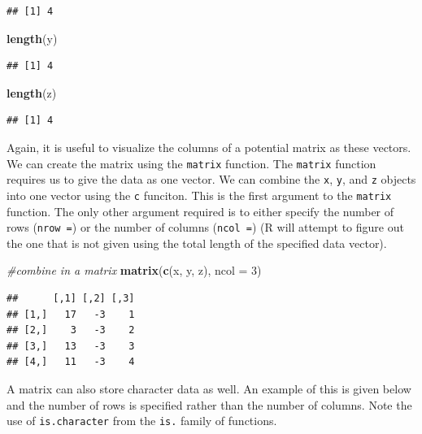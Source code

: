 \documentclass[
]{book}
\newenvironment{Shaded}{\begin{snugshade}}{\end{snugshade}}
\newcommand{\CommentTok}[1]{\textcolor[rgb]{0.56,0.35,0.01}{\textit{#1}}}
\newcommand{\DataTypeTok}[1]{\textcolor[rgb]{0.13,0.29,0.53}{#1}}
\newcommand{\DecValTok}[1]{\textcolor[rgb]{0.00,0.00,0.81}{#1}}
\newcommand{\KeywordTok}[1]{\textcolor[rgb]{0.13,0.29,0.53}{\textbf{#1}}}
\newcommand{\NormalTok}[1]{#1}
\theoremstyle{definition}
\theoremstyle{definition}
\theoremstyle{definition}
\theoremstyle{remark}
\begin{document}
\begin{verbatim}
## [1] 4
\end{verbatim}

\begin{Shaded}
\begin{Highlighting}[]
\KeywordTok{length}\NormalTok{(y)}
\end{Highlighting}
\end{Shaded}

\begin{verbatim}
## [1] 4
\end{verbatim}

\begin{Shaded}
\begin{Highlighting}[]
\KeywordTok{length}\NormalTok{(z)}
\end{Highlighting}
\end{Shaded}

\begin{verbatim}
## [1] 4
\end{verbatim}

Again, it is useful to visualize the columns of a potential matrix as these vectors. We can create the matrix using the \texttt{matrix} function. The \texttt{matrix} function requires us to give the data as one vector. We can combine the \texttt{x}, \texttt{y}, and \texttt{z} objects into one vector using the \texttt{c} funciton. This is the first argument to the \texttt{matrix} function. The only other argument required is to either specify the number of rows (\texttt{nrow\ =}) or the number of columns (\texttt{ncol\ =}) (R will attempt to figure out the one that is not given using the total length of the specified data vector).

\begin{Shaded}
\begin{Highlighting}[]
\CommentTok{#combine in a matrix}
\KeywordTok{matrix}\NormalTok{(}\KeywordTok{c}\NormalTok{(x, y, z), }\DataTypeTok{ncol =} \DecValTok{3}\NormalTok{)}
\end{Highlighting}
\end{Shaded}

\begin{verbatim}
##      [,1] [,2] [,3]
## [1,]   17   -3    1
## [2,]    3   -3    2
## [3,]   13   -3    3
## [4,]   11   -3    4
\end{verbatim}

A matrix can also store character data as well. An example of this is given below and the number of rows is specified rather than the number of columns. Note the use of \texttt{is.character} from the \texttt{is.} family of functions.
\end{document}
